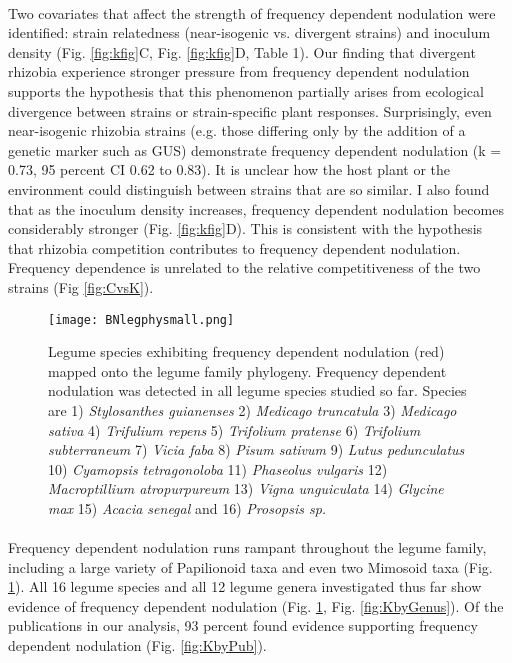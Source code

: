 \documentclass[12pt]{article}
\begin{document}
\begin{doublespace}
\paragraph{} Two covariates that affect the strength of frequency dependent nodulation were identified: strain relatedness (near-isogenic vs. divergent strains) and inoculum density (Fig. \ref{fig:kfig}C, Fig. \ref{fig:kfig}D, Table 1). Our finding that divergent rhizobia experience stronger pressure from frequency dependent nodulation supports the hypothesis that this phenomenon partially arises from ecological divergence between strains or strain-specific plant responses. Surprisingly, even near-isogenic rhizobia strains (e.g. those differing only by the addition of a genetic marker such as GUS) demonstrate frequency dependent nodulation (k = 0.73, 95 percent CI 0.62 to 0.83). It is unclear how the host plant or the environment could distinguish between strains that are so similar. I also found that as the inoculum density increases, frequency dependent nodulation becomes considerably stronger (Fig. \ref{fig:kfig}D). This is consistent with the hypothesis that rhizobia competition contributes to frequency dependent nodulation. Frequency dependence is unrelated to the relative competitiveness of the two strains (Fig \ref{fig:CvsK}). 
\begin{figure}[h!]
	\texttt{[image: BNlegphysmall.png]}
	\caption{Legume species exhibiting frequency dependent nodulation (red)
	mapped onto the legume family phylogeny. Frequency dependent nodulation was detected in all legume species studied so far. Species are 1) \textit{Stylosanthes guianenses} 2) \textit{Medicago truncatula} 3) \textit{Medicago sativa} 4) \textit{Trifulium repens} 5) \textit{Trifolium pratense} 6) \textit{Trifolium subterraneum} 7) \textit{Vicia faba} 8) \textit{Pisum sativum} 9) \textit{Lutus pedunculatus} 10) \textit{Cyamopsis tetragonoloba} 11) \textit{Phaseolus vulgaris} 12) \textit{Macroptillium atropurpureum} 13) \textit{Vigna unguiculata} 14) \textit{Glycine max} 15) \textit{Acacia senegal} and 16) \textit{Prosopsis sp.}}
	\label{fig:phylogeny}
\end{figure}
\paragraph{}
Frequency dependent nodulation runs rampant throughout the legume family, including a large variety of Papilionoid taxa and even two Mimosoid taxa (Fig. \ref{fig:phylogeny}). All 16 legume species and all 12 legume genera investigated thus far show evidence of frequency dependent nodulation (Fig. \ref{fig:phylogeny}, Fig. \ref{fig:KbyGenus}). Of the publications in our analysis, 93 percent found evidence supporting frequency dependent nodulation (Fig. \ref{fig:KbyPub}). 


\end{doublespace}
\end{document}
